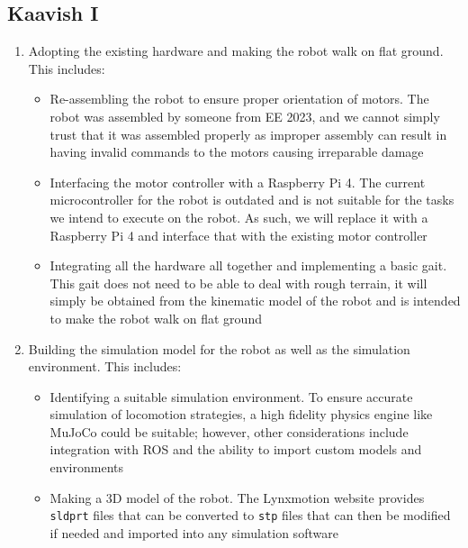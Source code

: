 \subsection{Kaavish I}
\begin{enumerate}
    \item Adopting the existing hardware and making the robot walk on flat ground. This includes:
    \begin{itemize}
        \item Re-assembling the robot to ensure proper orientation of motors. The robot was assembled by someone from EE 2023, and we cannot simply trust that it was assembled properly as improper assembly can result in having invalid commands to the motors causing irreparable damage
        \item Interfacing the motor controller with a Raspberry Pi 4. The current microcontroller for the robot is outdated and is not suitable for the tasks we intend to execute on the robot. As such, we will replace it with a Raspberry Pi 4 and interface that with the existing motor controller
        \item Integrating all the hardware all together and implementing a basic gait. This gait does not need to be able to deal with rough terrain, it will simply be obtained from the kinematic model of the robot and is intended to make the robot walk on flat ground
    \end{itemize}
    \item Building the simulation model for the robot as well as the simulation environment. This includes:
    \begin{itemize}
        \item Identifying a suitable simulation environment. To ensure accurate simulation of locomotion strategies, a high fidelity physics engine like MuJoCo could be suitable; however, other considerations include integration with ROS and the ability to import custom models and environments
        \item Making a 3D model of the robot. The Lynxmotion website provides \texttt{sldprt} files that can be converted to \texttt{stp} files that can then be modified if needed and imported into any simulation software

\end{itemize}
\end{enumerate}
